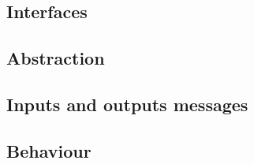 
\subsection{Interfaces}
\label{subsec:interfaces}

\subsection{Abstraction}


\subsection{Inputs and outputs messages}


\subsection{Behaviour}
\label{subsec:behavior}




